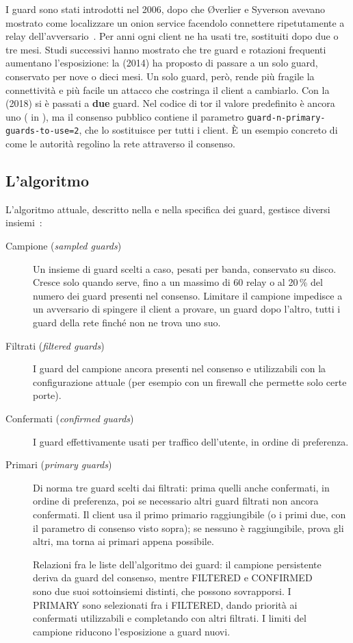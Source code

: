 I guard sono stati introdotti nel 2006, dopo che Øverlier e Syverson avevano mostrato come localizzare un onion service facendolo connettere ripetutamente a relay dell'avversario~\cite{overlier2006locating}. Per anni ogni client ne ha usati tre, sostituiti dopo due o tre mesi. Studi successivi hanno mostrato che tre guard e rotazioni frequenti aumentano l'esposizione: la  (2014) ha proposto di passare a un solo guard, conservato per nove o dieci mesi. Un solo guard, però, rende più fragile la connettività e più facile un attacco che costringa il client a cambiarlo. Con la  (2018) si è passati a \textbf{due} guard. Nel codice di tor il valore predefinito è ancora uno ( in ), ma il consenso pubblico contiene il parametro \texttt{guard-n-primary-guards-to-use=2}, che lo sostituisce per tutti i client. È un esempio concreto di come le autorità regolino la rete attraverso il consenso.

\subsection{L'algoritmo}

L'algoritmo attuale, descritto nella  e nella specifica dei guard, gestisce diversi insiemi~:
\begin{description}
  \item[Campione (\emph{sampled guards})] Un insieme di guard scelti a caso, pesati per banda, conservato su disco. Cresce solo quando serve, fino a un massimo di 60 relay o al 20\,\% del numero dei guard presenti nel consenso. Limitare il campione impedisce a un avversario di spingere il client a provare, un guard dopo l'altro, tutti i guard della rete finché non ne trova uno suo.
  \item[Filtrati (\emph{filtered guards})] I guard del campione ancora presenti nel consenso e utilizzabili con la configurazione attuale (per esempio con un firewall che permette solo certe porte).
  \item[Confermati (\emph{confirmed guards})] I guard effettivamente usati per traffico dell'utente, in ordine di preferenza.
  \item[Primari (\emph{primary guards})] Di norma tre guard scelti dai filtrati: prima quelli anche confermati, in ordine di preferenza, poi se necessario altri guard filtrati non ancora confermati. Il client usa il primo primario raggiungibile (o i primi due, con il parametro di consenso visto sopra); se nessuno è raggiungibile, prova gli altri, ma torna ai primari appena possibile.
\end{description}
\begin{figure}[htbp]
\centering

\caption{Relazioni fra le liste dell'algoritmo dei guard: il campione persistente deriva da guard del consenso, mentre FILTERED e CONFIRMED sono due suoi sottoinsiemi distinti, che possono sovrapporsi. I PRIMARY sono selezionati fra i FILTERED, dando priorità ai confermati utilizzabili e completando con altri filtrati. I limiti del campione riducono l'esposizione a guard nuovi.}
\label{fig:guard}
\end{figure}

